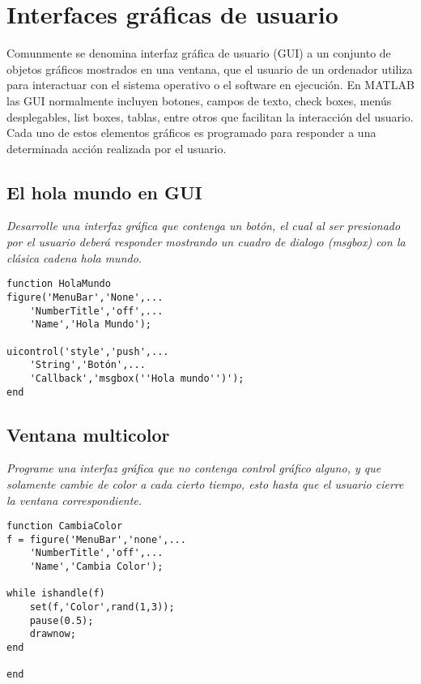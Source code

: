 \chapter{Interfaces gráficas de usuario}

Comunmente se denomina interfaz gráfica de usuario (GUI) a un conjunto de objetos gráficos mostrados en una 
ventana, que el usuario de un ordenador utiliza para interactuar con el sistema operativo o el software en 
ejecución. En MATLAB las GUI normalmente incluyen botones, campos de texto, check boxes, menús desplegables, 
list boxes, tablas, entre otros que facilitan la interacción del usuario. Cada uno de estos elementos gráficos 
es programado para responder a una determinada acción realizada por el usuario.

\section{El hola mundo en GUI}

\textit{Desarrolle una interfaz gráfica que contenga un botón, el cual al ser presionado por el usuario deberá \textit{responder} mostrando un cuadro de dialogo (msgbox) con la clásica cadena \textit{hola mundo}.}



\begin{verbatim}
function HolaMundo
figure('MenuBar','None',...
    'NumberTitle','off',...
    'Name','Hola Mundo');
 
uicontrol('style','push',...
    'String','Botón',...
    'Callback','msgbox(''Hola mundo'')');
end
\end{verbatim}

\section{Ventana multicolor}

\textit{Programe una interfaz gráfica que no contenga control gráfico alguno, y que solamente cambie de color a cada cierto tiempo, esto hasta que el usuario cierre la ventana correspondiente.}



\begin{verbatim}
function CambiaColor
f = figure('MenuBar','none',...
    'NumberTitle','off',...
    'Name','Cambia Color');
 
while ishandle(f)
    set(f,'Color',rand(1,3));
    pause(0.5);
    drawnow;
end
 
end
\end{verbatim}

